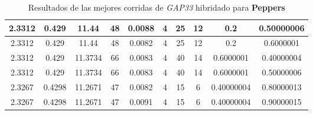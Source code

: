\begin{table}[h!]
\begin{center}
\begin{tabular}{|c|c|c|c|c|c|c|c|c|c|}
        \hline
        \hline
            2.3312 & 0.429  & 11.44 & 48 & 0.0088 & 4 & 25 & 12 & 0.2 & 0.50000006\\
        \hline
        \hline
            2.3312 & 0.429  & 11.44 & 48 & 0.0082 & 4 & 25 & 12 & 0.2 & 0.6000001\\
        \hline
        \hline
            2.3312 & 0.429  & 11.3734 & 66 & 0.0083 & 4 & 40 & 14 & 0.6000001 & 0.40000004\\
        \hline
        \hline
            2.3312 & 0.429  & 11.3734 & 66 & 0.0083 & 4 & 40 & 14 & 0.6000001 & 0.50000006\\
        \hline
        \hline
            2.3267 & 0.4298  & 11.2671 & 47 & 0.0082 & 4 & 15 & 6 & 0.40000004 & 0.80000013\\
        \hline
        \hline
            2.3267 & 0.4298  & 11.2671 & 47 & 0.0091 & 4 & 15 & 6 & 0.40000004 & 0.90000015\\
        \hline
        \end{tabular}
        \caption{Resultados de las mejores corridas de \emph{GAP33} hibridado para {\bf Peppers}}
        \label{tb:tableGAP33}
    \end{center}
\end{table}
